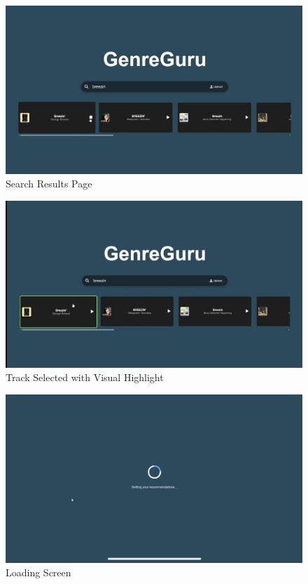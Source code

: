 \documentclass[12pt]{article}
\begin{document}
\begin{figure}[H]
    \centering
    \includegraphics[width=\textwidth]{normans_principles_figures/img2.jpg}
    \caption{Search Results Page}
    \label{img2}
\end{figure}

\begin{figure}[H]
    \centering
    \includegraphics[width=\textwidth]{normans_principles_figures/img3.jpg}
    \caption{Track Selected with Visual Highlight}
    \label{img3}
\end{figure}

\begin{figure}[H]
    \centering
    \includegraphics[width=\textwidth]{normans_principles_figures/img4.jpg}
    \caption{Loading Screen}
    \label{img4}
\end{figure}
\end{document}
